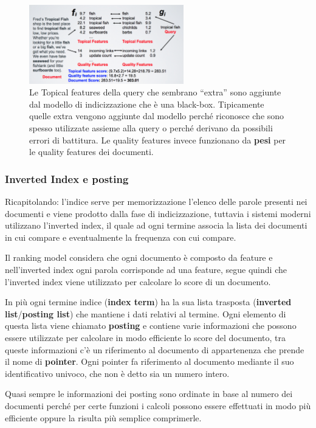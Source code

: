\begin{figure}[htbp]
	\centering
	\includegraphics[width=0.6\textwidth]{./images/l6-modello-2}
	\caption{Le Topical features della query che sembrano ``extra'' sono aggiunte dal modello di indicizzazione che è una black-box. Tipicamente quelle extra vengono aggiunte dal modello perché riconosce che sono spesso utilizzate assieme alla query o perché derivano da possibili errori di battitura. Le quality features invece funzionano da \textbf{pesi} per le quality features dei documenti.}
\end{figure}

\subsubsection{Inverted Index e posting}

Ricapitolando: l'indice serve per memorizzazione l'elenco delle parole presenti nei documenti e viene prodotto dalla fase di indicizzazione, tuttavia i sistemi moderni utilizzano l'inverted index, il quale ad ogni termine associa la lista dei documenti in cui compare e eventualmente la frequenza con cui compare. 

Il ranking model considera che ogni documento è composto da feature e nell'inverted index ogni parola corrisponde ad una feature, segue quindi che l'inverted index viene utilizzato per calcolare lo score di un documento.

In più ogni termine indice (\textbf{index term}) ha la sua lista trasposta (\textbf{inverted list}/\textbf{posting list}) che mantiene i dati relativi al termine.
Ogni elemento di questa lista viene chiamato \textbf{posting} e contiene varie informazioni che possono essere utilizzate per calcolare in modo efficiente lo score del documento, tra queste informazioni c'è un riferimento al documento di appartenenza che prende il nome di \textbf{pointer}.
Ogni pointer fa riferimento al documento mediante il suo identificativo univoco, che non è detto sia un numero intero.

Quasi sempre le informazioni dei posting sono ordinate in base al numero dei documenti perché per certe funzioni i calcoli possono essere effettuati in modo più efficiente oppure la risulta più semplice comprimerle.

